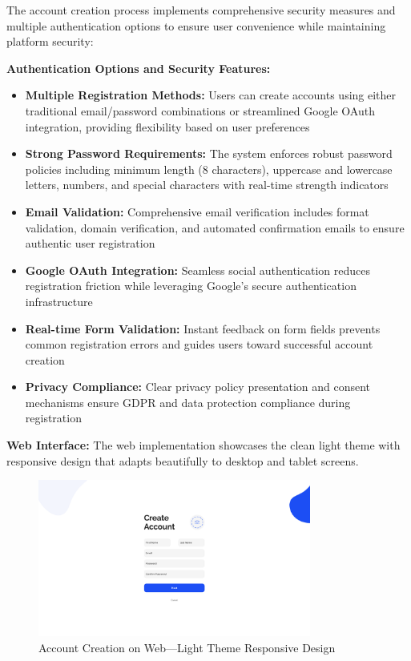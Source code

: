 The account creation process implements comprehensive security measures and multiple authentication options to ensure user convenience while maintaining platform security:

\textbf{Authentication Options and Security Features:}
\begin{itemize}
    \item \textbf{Multiple Registration Methods:} Users can create accounts using either traditional email/password combinations or streamlined Google OAuth integration, providing flexibility based on user preferences
    \item \textbf{Strong Password Requirements:} The system enforces robust password policies including minimum length (8 characters), uppercase and lowercase letters, numbers, and special characters with real-time strength indicators
    \item \textbf{Email Validation:} Comprehensive email verification includes format validation, domain verification, and automated confirmation emails to ensure authentic user registration
    \item \textbf{Google OAuth Integration:} Seamless social authentication reduces registration friction while leveraging Google's secure authentication infrastructure
    \item \textbf{Real-time Form Validation:} Instant feedback on form fields prevents common registration errors and guides users toward successful account creation
    \item \textbf{Privacy Compliance:} Clear privacy policy presentation and consent mechanisms ensure GDPR and data protection compliance during registration
\end{itemize}

\textbf{Web Interface:}
The web implementation showcases the clean light theme with responsive design that adapts beautifully to desktop and tablet screens.

\begin{figure}[!htbp]
    \centering
    \includegraphics[width=0.8\textwidth]{figures/ui/create_account_web.png}
    \caption{Account Creation on Web---Light Theme Responsive Design}
    \label{fig:web_account_creation}
\end{figure}

